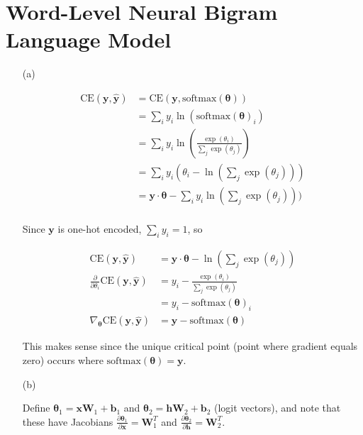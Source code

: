 \documentclass{article}
\begin{document}
\section{Word-Level Neural Bigram Language Model}


\begin{itemize}
    \item[(a)]
    
    \begin{align*}
        \text{CE}(\mathbf{y}, \hat{\mathbf{y}}) &= \text{CE}(\mathbf{y}, \text{softmax}(\boldsymbol{\theta})) \\
        &= \sum_i y_i \ln (\text{softmax}(\boldsymbol{\theta})_i) \\
        &= \sum_i y_i \ln \left( \frac{\exp(\theta_i)}{\sum_j \exp(\theta_j)} \right) \\
        &= \sum_i y_i \left(\theta_i - \ln\left(\sum_j \exp(\theta_j)\right)\right) \\
        &= \mathbf{y} \cdot \boldsymbol{\theta} - \sum_i y_i \ln(\sum_j \exp(\theta_j))) \\
    \end{align*}
    
    Since $\mathbf{y}$ is one-hot encoded, $\sum_i y_i = 1$, so
    
    \begin{align*}
        \text{CE}(\mathbf{y}, \hat{\mathbf{y}}) &= \mathbf{y} \cdot \boldsymbol{\theta} - \ln(\sum_j \exp(\theta_j)) \\
        \frac{\partial}{\partial \theta_i} \text{CE}(\mathbf{y}, \hat{\mathbf{y}}) &= y_i - \frac{\exp(\theta_i)}{\sum_j \exp(\theta_j)} \\
        &= y_i - \text{softmax}(\boldsymbol{\theta})_i \\
        \nabla_{\boldsymbol{\theta}} \text{CE}(\mathbf{y}, \hat{\mathbf{y}}) &= \mathbf{y} - \text{softmax}(\boldsymbol{\theta})
    \end{align*}
    
    This makes sense since the unique critical point (point where gradient equals zero) occurs where $\text{softmax}(\boldsymbol{\theta}) = \mathbf{y}$.
    
    \item[(b)]
    
    Define $\boldsymbol{\theta}_1 = \mathbf{x}\mathbf{W}_1 + \mathbf{b}_1$ and $\boldsymbol{\theta}_2 = \mathbf{h}\mathbf{W}_2 + \mathbf{b}_2$ (logit vectors), and note that these have Jacobians $\frac{\partial \boldsymbol{\theta}_1}{\partial \mathbf{x}} = \mathbf{W}_1^T$ and $\frac{\partial \boldsymbol{\theta}_2}{\partial \mathbf{h}} = \mathbf{W}_2^T$.
    

\end{itemize}
\end{document}
